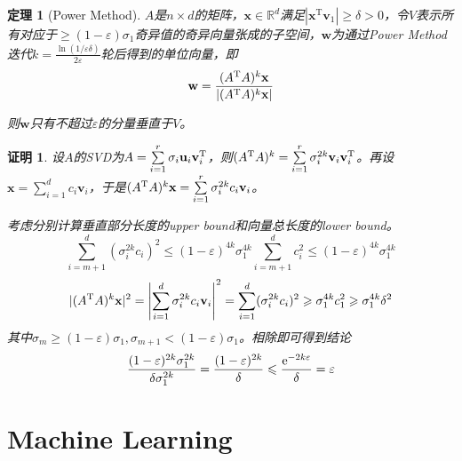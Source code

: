 \documentclass[8pt]{article}
\theoremstyle{compact}
\newtheorem{theorem}{定理}
\newtheorem{Proof}{证明}
\def\le{\leqslant}
\def\ge{\geqslant}
\begin{document}
\begin{theorem}[Power Method]
	$A$是$n \times d$的矩阵，$\mathbf x \in \mathbb R^d$满足$|\mathbf x^\text{T}\mathbf v_1| \ge \delta > 0$，令$V$表示所有对应于$\ge (1 - \varepsilon)\sigma_1$奇异值的奇异向量张成的子空间，$\mathbf w$为通过Power Method迭代$k = \frac{\ln(1 / \varepsilon \delta)}{2\varepsilon}$轮后得到的单位向量，即
	\begin{equation}
	\mathbf w = \frac{ (A^{\text T}A)^k\mathbf x }{|(A^{\text T}A)^k\mathbf x|}
	\end{equation}
	
	则$\mathbf w$只有不超过$\varepsilon$的分量垂直于$V$。
\end{theorem}
\begin{Proof}
	设$A$的SVD为$A = \sum\limits_{i=1}^{r}\sigma_i\mathbf u_i\mathbf v_i^{\text T}$，则$(A^{\text T}A)^k = \sum\limits_{i=1}^{r}\sigma_i^{2k}\mathbf v_i\mathbf v_i^{\text T}$。再设$\mathbf x = \sum\limits_{i=1}^{d}c_i\mathbf v_i$，于是$(A^{\text T}A)^k\mathbf x = \sum\limits_{i=1}^{r}\sigma_i^{2k}c_i\mathbf v_i$。
	
	考虑分别计算垂直部分长度的upper bound和向量总长度的lower bound。
	\begin{equation}
	\sum_{i=m+1}^{d}(\sigma_i^{2k}c_i)^2 \le (1 - \varepsilon)^{4k}\sigma_1^{4k}\sum_{i=m+1}^{d}c_i^2 \le (1 - \varepsilon)^{4k}\sigma_1^{4k}
	\end{equation}
	\begin{equation}
	|(A^{\text T}A)^k\mathbf x|^2 = \left|\sum_{i=1}^{d}\sigma_i^{2k}c_i\mathbf v_i\right|^2 = \sum_{i=1}^{d}(\sigma_i^{2k}c_i)^2 \ge \sigma_1^{4k}c_1^2 \ge \sigma_1^{4k}\delta^2
	\end{equation}
	其中$\sigma_m \ge (1 - \varepsilon)\sigma_1, \sigma_{m+1} < (1 - \varepsilon)\sigma_1$。相除即可得到结论
	\begin{equation}
	\frac{(1 - \varepsilon)^{2k}\sigma_1^{2k}}{\delta\sigma_1^{2k}} = \frac{(1 - \varepsilon)^{2k}}{\delta} \le \frac{\text e^{-2k\varepsilon}}{\delta} = \varepsilon
	\end{equation}
\end{Proof}
\newpage
\section{Machine Learning}
\end{document}
